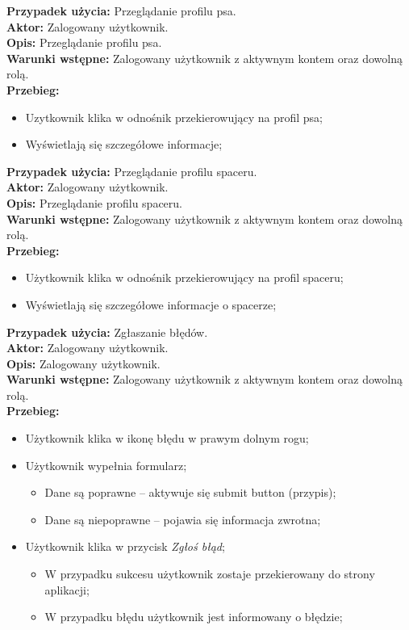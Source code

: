 \noindent
\textbf{Przypadek użycia:} Przeglądanie profilu psa. \\
\textbf{Aktor:} Zalogowany użytkownik. \\
\textbf{Opis:} Przeglądanie profilu psa. \\
\textbf{Warunki wstępne:} Zalogowany użytkownik z aktywnym kontem oraz dowolną rolą. \\
\textbf{Przebieg:}
\begin{itemize}[leftmargin=1cm]
    \item Uzytkownik klika w odnośnik przekierowujący na profil psa;
    \item Wyświetlają się szczegółowe informacje;
\end{itemize}

\noindent
\textbf{Przypadek użycia:} Przeglądanie profilu spaceru. \\
\textbf{Aktor:} Zalogowany użytkownik. \\
\textbf{Opis:} Przeglądanie profilu spaceru. \\
\textbf{Warunki wstępne:} Zalogowany użytkownik z aktywnym kontem oraz dowolną rolą. \\
\textbf{Przebieg:}
\begin{itemize}[leftmargin=1cm]
    \item Użytkownik klika w odnośnik przekierowujący na profil spaceru;
    \item Wyświetlają się szczegółowe informacje o spacerze;
\end{itemize}

\noindent
\textbf{Przypadek użycia:} Zgłaszanie błędów. \\
\textbf{Aktor:} Zalogowany użytkownik. \\
\textbf{Opis:}  Zalogowany użytkownik. \\
\textbf{Warunki wstępne:} Zalogowany użytkownik z aktywnym kontem oraz dowolną rolą. \\
\textbf{Przebieg:}
\begin{itemize}[leftmargin=1cm]
    \item Użytkownik klika w ikonę błędu w prawym dolnym rogu;
    \item Użytkownik wypełnia formularz;
    \begin{itemize}
        \item Dane są poprawne -- aktywuje się submit button (przypis);
        \item Dane są niepoprawne -- pojawia się informacja zwrotna;
    \end{itemize}
    \item Użytkownik klika w przycisk \textit{Zgłoś błąd};
    \begin{itemize}
        \item W przypadku sukcesu użytkownik zostaje przekierowany do strony aplikacji;
        \item W przypadku błędu użytkownik jest informowany o błędzie;
    \end{itemize}
\end{itemize}

